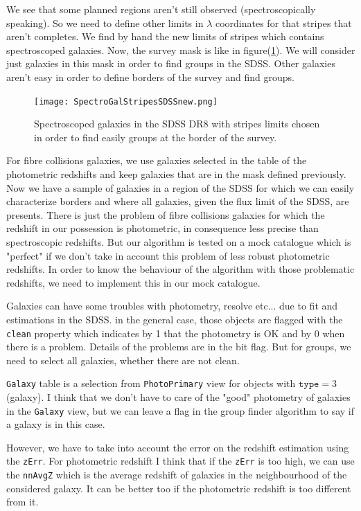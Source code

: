 We see that some planned regions aren't still observed (spectroscopically speaking). So we need to define other limits in $\lambda$
coordinates for that stripes that aren't completes. We find by hand the new limits of stripes which contains spectroscoped galaxies.
Now, the survey mask is like in figure(\ref{fig:SDSSspecgalstripesnew}). We will consider just galaxies in this mask in order to
find groups in the SDSS. Other galaxies aren't easy in order to define borders of the survey and find groups.
\begin{figure}[ht]
	\centering
	\texttt{[image: SpectroGalStripesSDSSnew.png]}
	\caption{\footnotesize{}Spectroscoped galaxies in the SDSS DR8 with stripes limits chosen in order to find easily groups at
	the border of the survey.}
	\label{fig:SDSSspecgalstripesnew}
\end{figure}

For fibre collisions galaxies, we use galaxies selected in the table of the photometric redshifts and keep galaxies that are in the
mask defined previously. Now we have a sample of galaxies in a region of the SDSS for which we can easily characterize borders and
where all galaxies, given the flux limit of the SDSS, are presents. There is just the problem of fibre collisions galaxies for which
the redshift in our possession is photometric, in consequence less precise than spectroscopic redshifts. But our algorithm is tested
on a mock catalogue which is "perfect" if we don't take in account this problem of less robust photometric redshifts. In order to
know the behaviour of the algorithm with those problematic redshifts, we need to implement this in our mock catalogue.


Galaxies can have some troubles with photometry, resolve etc... due to fit and estimations in the SDSS. in the general case, those
objects are flagged with the \texttt{clean} property which indicates by \num{1} that the photometry is OK and by \num{0} when there
is a problem. Details of the problems are in the bit flag. But for groups, we need to select all galaxies, whether there are not
clean.

\texttt{Galaxy} table is a selection from \texttt{PhotoPrimary} view for objects with $\mathrm{\texttt{type}}=3$ (galaxy). I think
that we don't have to care of the "good" photometry of galaxies in the \texttt{Galaxy} view, but we can leave a flag in the group
finder algorithm to say if a galaxy is in this case.

However, we have to take into account the error on the redshift estimation using the \texttt{zErr}. For photometric redshift I think
that if the \texttt{zErr} is too high, we can use the \texttt{nnAvgZ} which is the average redshift of galaxies in the neighbourhood
of the considered galaxy. It can be better too if the photometric redshift is too different from it.

